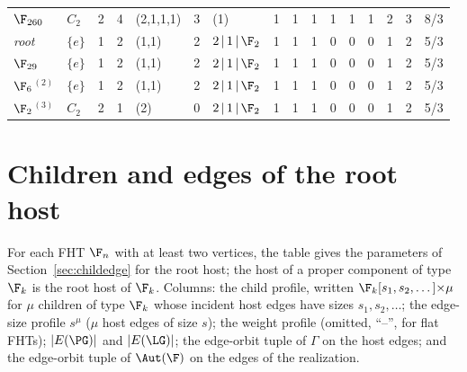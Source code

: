 \begin{landscape}
{\begin{longtable}{@{}l l r r l r l rrr rrr rrr@{}}
\addlinespace[3pt]
\textbf{$\F_{260}$} & $C_{2}$ & 2 & 4 & (2,1,1,1) & 3 & (1) & 1 & 1 & 1 & 1 & 1 & 1 & 2 & 3 & 8/3 \\
\quad\textit{root} & $\{e\}$ & 1 & 2 & (1,1) & 2 & $2\,|\,1\,|\,\F_{2}$ & 1 & 1 & 1 & 0 & 0 & 0 & 1 & 2 & 5/3 \\
\quad$\F_{29}$ & $\{e\}$ & 1 & 2 & (1,1) & 2 & $2\,|\,1\,|\,\F_{2}$ & 1 & 1 & 1 & 0 & 0 & 0 & 1 & 2 & 5/3 \\
\quad$\F_{6}$$^{(2)}$ & $\{e\}$ & 1 & 2 & (1,1) & 2 & $2\,|\,1\,|\,\F_{2}$ & 1 & 1 & 1 & 0 & 0 & 0 & 1 & 2 & 5/3 \\
\quad$\F_{2}$$^{(3)}$ & $C_{2}$ & 2 & 1 & (2) & 0 & $2\,|\,1\,|\,\F_{2}$ & 1 & 1 & 1 & 0 & 0 & 0 & 1 & 2 & 5/3 \\
\end{longtable}}
\end{landscape}

\section{Children and edges of the root host}\label{sec:annexB}

For each FHT $\F_n$ with at least two vertices, the table gives the parameters of Section~\ref{sec:childedge} for the root host; the host of a proper component of type $\F_k$ is the root host of $\F_k$. Columns: the child profile, written $\F_k[s_1,s_2,\dots]{\times}\mu$ for $\mu$ children of type $\F_k$ whose incident host edges have sizes $s_1,s_2,\dots$; the edge-size profile $s^{\mu}$ ($\mu$ host edges of size $s$); the weight profile (omitted, ``--'', for flat FHTs); $\lvert E(\PG)\rvert{}$ and $\lvert E(\LG)\rvert{}$; the edge-orbit tuple of $\Gamma$ on the host edges; and the edge-orbit tuple of $\Aut(\F)$ on the edges of the realization.

